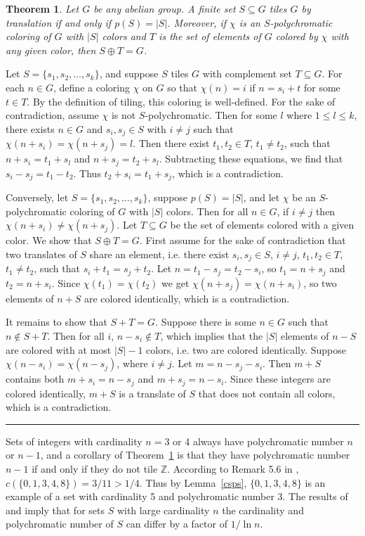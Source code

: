 \documentclass[12pt]{article}
\newenvironment{proof}{{\bf Proof:  }}{\hfill\rule{2mm}{2mm}}
\newtheorem{theorem}{Theorem}
\newcommand{\Z}{\ensuremath{\mathbb Z}}
\begin{document}
\begin{theorem}\label{polytile}
Let $G$ be any abelian group. A finite set $S \subseteq G$ tiles $G$ by translation if and only if $p(S)=|S|$. Moreover, if $\chi$ is an $S$-polychromatic coloring of $G$ with $|S|$ colors and $T$ is the set of  elements of $G$ colored by $\chi$ with any given color, then $S \oplus T = G$.
\end{theorem}
\begin{proof}
Let $S=\{s_1, s_2, \ldots, s_k\}$, and suppose $S$ tiles $G$ with complement set $T \subseteq G$.  For each $n\in G$, define a coloring $\chi$ on $G$ so that $\chi(n) = i$ if $n =s_i+t$ for some $t\in T$. By the definition of tiling, this coloring is well-defined. For the sake of contradiction, assume $\chi$ is not $S$-polychromatic. Then for some $l$ where $1 \le l \le k$, there exists $n\in G$ and $s_i, s_j \in S$ with $i \neq j$ such that  $\chi(n+s_i)= \chi(n+s_j) = l$. Then there exist $t_1, t_2 \in T$, $t_1 \neq t_2$, such that $n+s_i = t_1 + s_l$ and $n+s_j = t_2 + s_l$. Subtracting these equations, we find that $s_i -s_j = t_1-t_2$.  Thus $t_2 + s_i=t_1 + s_j$, which is a contradiction.

Conversely, let $S=\{s_1, s_2, \ldots, s_k\}$, suppose $p(S)=|S|$, and let $\chi$ be an $S$-polychromatic coloring of $G$ with $|S|$ colors. Then for all $n \in G$, if $i \neq j$ then $\chi(n+s_i) \neq \chi(n+s_j)$. Let $T\subseteq G$ be the set of elements colored with a given color.  We show that $S \oplus T = G$. First assume for the sake of contradiction that two translates of $S$ share an element, i.e. there exist $s_i, s_j \in S$, $i \neq j$, $t_1, t_2 \in T$, $t_1 \neq t_2$, such that $s_i + t_1 = s_j + t_2$.  Let $n=t_1-s_j=t_2-s_i$, so $t_1 = n+s_j$ and $t_2 = n+s_i$.  Since $\chi(t_1)= \chi(t_2)$ we get $\chi(n+s_j)= \chi(n+s_i)$, so two elements of $n+S$ are colored identically, which is a contradiction. 

It remains to show that $S+T=G$. Suppose there is some $n \in G$ such that $n \notin S+T$. Then for all $i$, $n-s_i \notin T$, which implies that the $|S|$ elements of $n-S$ are colored with at most $|S|-1$ colors, i.e. two are colored identically.  Suppose $\chi(n-s_i) =\chi(n-s_j)$, where $i \neq j$.  Let $m=n-s_j-s_i$.  Then $m+S$ contains both $m+s_i =n-s_j$ and $m+s_j= n-s_i$. Since these integers are colored identically, $m+S$ is a translate of $S$ that does not contain all colors, which is a contradiction.
\end{proof}

Sets of integers with cardinality $n=3$ or 4 always have polychromatic number $n$ or $n-1$, and a corollary of Theorem~\ref{polytile} is that they have polychromatic number $n-1$ if and only if they do not tile $\Z$. According to Remark 5.6 in \cite{BJR11}, $c(\{0,1,3,4,8\}) = 3/11 > 1/4$.  Thus by Lemma~\ref{csps}, $\{0,1,3,4,8\}$ is an example of a set with cardinality 5 and polychromatic number 3. The results of \cite{AKN95} and \cite{HS16} imply that for sets $S$ with large cardinality $n$ the cardinality and polychromatic number  of $S$ can differ by a factor of $1/\ln n$. 
\end{document}
